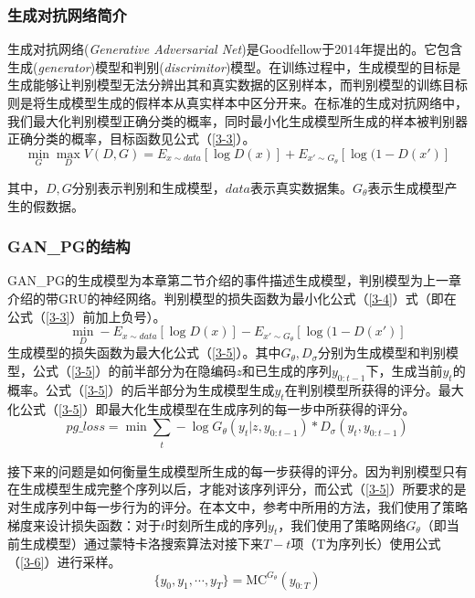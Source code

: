 \documentclass[]{template}
\begin{document}
\subsubsection{生成对抗网络简介}
生成对抗网络(\textit{Generative Adversarial Net}\cite{goodfellow_generative_2014})是Goodfellow于2014年提出的。它包含生成(\textit{generator})模型和判别(\textit{discrimitor})模型。在训练过程中，生成模型的目标是生成能够让判别模型无法分辨出其和真实数据的区别样本，而判别模型的训练目标则是将生成模型生成的假样本从真实样本中区分开来。在标准的生成对抗网络中，我们最大化判别模型正确分类的概率，同时最小化生成模型所生成的样本被判别器正确分类的概率，目标函数见公式（\ref{3-3}）。
\begin{equation}\label{3-3}
    \mathop{min}_G \mathop{max}_D V(D,G)=E_{x\sim data}[\log D(x)]+E_{x'\sim G_\theta}[\log(1-D(x')]
\end{equation}

其中，$D,G$分别表示判别和生成模型，$data$表示真实数据集。$G_\theta$表示生成模型产生的假数据。
\subsubsection{GAN\_PG的结构}
GAN\_PG的生成模型为本章第二节介绍的事件描述生成模型，判别模型为上一章介绍的带GRU的神经网络。判别模型的损失函数为最小化公式（\ref{3-4}）式（即在公式（\ref{3-3}）前加上负号）。
\begin{equation}\label{3-4}
    \mathop{min}_D-E_{x\sim data}[\log D(x)]-E_{x'\sim G_\theta}[\log(1-D(x')]
\end{equation}
生成模型的损失函数为最大化公式（\ref{3-5}）。其中$G_\theta,D_\sigma$分别为生成模型和判别模型，公式（\ref{3-5}）的前半部分为在隐编码$z$和已生成的序列$y_{0:t-1}$下，生成当前$y_t$的概率。公式（\ref{3-5}）的后半部分为生成模型生成$y_t$在判别模型所获得的评分。最大化公式（\ref{3-5}）即最大化生成模型在生成序列的每一步中所获得的评分。
\begin{equation}\label{3-5}
pg\_loss=\mathop{min}\sum_{\substack{t}}-\log G_\theta (y_t|z,y_{0:t-1})*D_\sigma (y_t,y_{0:t-1})
\end{equation}

接下来的问题是如何衡量生成模型所生成的每一步获得的评分。因为判别模型只有在生成模型生成完整个序列以后，才能对该序列评分，而公式（\ref{3-5}）所要求的是对生成序列中每一步行为的评分。在本文中，参考\cite{yu_seqgan:_2016}中所用的方法，我们使用了策略梯度来设计损失函数：对于$t$时刻所生成的序列$y_t$，我们使用了策略网络$G_\theta$（即当前生成模型）通过蒙特卡洛搜索算法对接下来$T-t$项（T为序列长）使用公式（\ref{3-6}）进行采样。
\begin{equation}\label{3-6}
    \{y_0,y_1,\dotsb,y_T\}=\mathrm{MC}^{G_\theta}(y_{0:T})
\end{equation}
\end{document}
